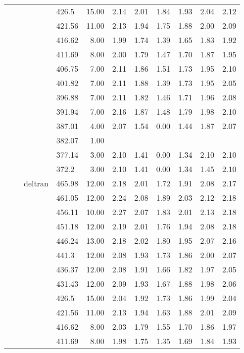 \begin{longtable}{llllrrrrrrr}
   &  &  & 426.5 & 15.00 & 2.14 & 2.01 & 1.84 & 1.93 & 2.04 & 2.12 \\ 
   &  &  & 421.56 & 11.00 & 2.13 & 1.94 & 1.75 & 1.88 & 2.00 & 2.09 \\ 
   &  &  & 416.62 & 8.00 & 1.99 & 1.74 & 1.39 & 1.65 & 1.83 & 1.92 \\ 
   &  &  & 411.69 & 8.00 & 2.00 & 1.79 & 1.47 & 1.70 & 1.87 & 1.95 \\ 
   &  &  & 406.75 & 7.00 & 2.11 & 1.86 & 1.51 & 1.73 & 1.95 & 2.10 \\ 
   &  &  & 401.82 & 7.00 & 2.11 & 1.88 & 1.39 & 1.73 & 1.95 & 2.05 \\ 
   &  &  & 396.88 & 7.00 & 2.11 & 1.82 & 1.46 & 1.71 & 1.96 & 2.08 \\ 
   &  &  & 391.94 & 7.00 & 2.16 & 1.87 & 1.48 & 1.79 & 1.98 & 2.10 \\ 
   &  &  & 387.01 & 4.00 & 2.07 & 1.54 & 0.00 & 1.44 & 1.87 & 2.07 \\ 
   &  &  & 382.07 & 1.00 &  &  &  &  &  &  \\ 
   &  &  & 377.14 & 3.00 & 2.10 & 1.41 & 0.00 & 1.34 & 2.10 & 2.10 \\ 
   &  &  & 372.2 & 3.00 & 2.10 & 1.41 & 0.00 & 1.34 & 1.45 & 2.10 \\ 
   &  & deltran & 465.98 & 12.00 & 2.18 & 2.01 & 1.72 & 1.91 & 2.08 & 2.17 \\ 
   &  &  & 461.05 & 12.00 & 2.24 & 2.08 & 1.89 & 2.03 & 2.12 & 2.18 \\ 
   &  &  & 456.11 & 10.00 & 2.27 & 2.07 & 1.83 & 2.01 & 2.13 & 2.18 \\ 
   &  &  & 451.18 & 12.00 & 2.19 & 2.01 & 1.76 & 1.94 & 2.08 & 2.18 \\ 
   &  &  & 446.24 & 13.00 & 2.18 & 2.02 & 1.80 & 1.95 & 2.07 & 2.16 \\ 
   &  &  & 441.3 & 12.00 & 2.08 & 1.93 & 1.73 & 1.86 & 2.00 & 2.07 \\ 
   &  &  & 436.37 & 12.00 & 2.08 & 1.91 & 1.66 & 1.82 & 1.97 & 2.05 \\ 
   &  &  & 431.43 & 12.00 & 2.09 & 1.93 & 1.67 & 1.88 & 1.98 & 2.06 \\ 
   &  &  & 426.5 & 15.00 & 2.04 & 1.92 & 1.73 & 1.86 & 1.99 & 2.04 \\ 
   &  &  & 421.56 & 11.00 & 2.13 & 1.94 & 1.63 & 1.88 & 2.01 & 2.09 \\ 
   &  &  & 416.62 & 8.00 & 2.03 & 1.79 & 1.55 & 1.70 & 1.86 & 1.97 \\ 
   &  &  & 411.69 & 8.00 & 1.98 & 1.75 & 1.35 & 1.69 & 1.84 & 1.93 \\ 

\end{longtable}
